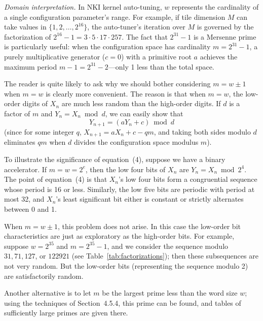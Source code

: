 \documentclass[12pt]{article}
\begin{document}
\begin{table}[ht]
\begin{center}
\begin{tabular}{@{}clll@{}}
\bottomrule
\end{tabular}
\end{center}
\medskip
\noindent\textit{Domain interpretation.} In NKI kernel auto-tuning, $w$ represents the cardinality of a single configuration parameter's range. For example, if tile dimension $M$ can take values in $\{1, 2, \ldots, 2^{16}\}$, the auto-tuner's iteration over $M$ is governed by the factorization of $2^{16} - 1 = 3 \cdot 5 \cdot 17 \cdot 257$. The fact that $2^{31}-1$ is a Mersenne prime is particularly useful: when the configuration space has cardinality $m = 2^{31}-1$, a purely multiplicative generator ($c=0$) with a primitive root $a$ achieves the maximum period $m-1 = 2^{31}-2$---only 1 less than the total space.
\end{table}

The reader is quite likely to ask why we should bother considering $m = w \pm 1$ when $m = w$ is clearly more convenient. The reason is that when $m = w$, the low-order digits of $X_n$ are much less random than the high-order digits. If $d$ is a factor of $m$ and $Y_n = X_n \bmod d$, we can easily show that
\begin{equation}
Y_{n+1} = (aY_n + c) \bmod d \tag{4}
\end{equation}
(since for some integer $q$, $X_{n+1} = aX_n + c - qm$, and taking both sides modulo $d$ eliminates $qm$ when $d$ divides the configuration space modulus $m$).

To illustrate the significance of equation~(4), suppose we have a binary accelerator. If $m = w = 2^e$, then the low four bits of $X_n$ are $Y_n = X_n \bmod 2^4$. The point of equation~(4) is that $X_n$'s low four bits form a congruential sequence whose period is 16 or less. Similarly, the low five bits are periodic with period at most 32, and $X_n$'s least significant bit either is constant or strictly alternates between 0 and 1.

When $m = w \pm 1$, this problem does not arise. In this case the low-order bit characteristics are just as exploratory as the high-order bits. For example, suppose $w = 2^{35}$ and $m = 2^{35} - 1$, and we consider the sequence modulo $31, 71, 127$, or $122921$ (see Table~\ref{tab:factorizations}); then these subsequences are not very random. But the low-order bits (representing the sequence modulo 2) are satisfactorily random.

Another alternative is to let $m$ be the largest prime less than the word size $w$; using the techniques of Section~4.5.4, this prime can be found, and tables of sufficiently large primes are given there.
\end{document}
